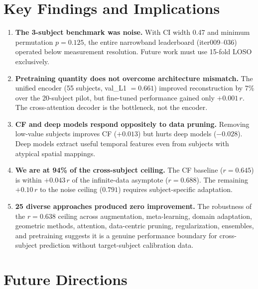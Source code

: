 \documentclass[11pt,a4paper]{article}
\begin{document}
\section{Key Findings and Implications}
\label{sec:findings}

\begin{enumerate}
  \item \textbf{The 3-subject benchmark was noise.} With CI width 0.47 and
    minimum permutation $p = 0.125$, the entire narrowband leaderboard
    (iter009--036) operated below measurement resolution. Future work must
    use 15-fold LOSO exclusively.

  \item \textbf{Pretraining quantity does not overcome architecture
    mismatch.} The unified encoder (55 subjects, val\_L1 $= 0.661$)
    improved reconstruction by 7\% over the 20-subject pilot, but
    fine-tuned performance gained only $+0.001\,r$. The cross-attention
    decoder is the bottleneck, not the encoder.

  \item \textbf{CF and deep models respond oppositely to data pruning.}
    Removing low-value subjects improves CF ($+0.013$) but hurts deep
    models ($-0.028$). Deep models extract useful temporal features even
    from subjects with atypical spatial mappings.

  \item \textbf{We are at 94\% of the cross-subject ceiling.} The CF
    baseline ($r = 0.645$) is within $+0.043\,r$ of the infinite-data
    asymptote ($r = 0.688$). The remaining $+0.10\,r$ to the noise ceiling
    ($0.791$) requires subject-specific adaptation.

  \item \textbf{25 diverse approaches produced zero improvement.} The
    robustness of the $r = 0.638$ ceiling across augmentation,
    meta-learning, domain adaptation, geometric methods, attention,
    data-centric pruning, regularization, ensembles, and pretraining
    suggests it is a genuine performance boundary for cross-subject
    prediction without target-subject calibration data.
\end{enumerate}

\section{Future Directions}
\label{sec:future}
\end{document}
